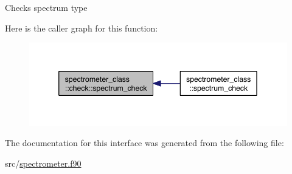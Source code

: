 Checks spectrum type 



Here is the caller graph for this function\-:
\nopagebreak
\begin{figure}[H]
\begin{center}
\leavevmode
\includegraphics[width=346pt]{interfacespectrometer__class_1_1check_a1d14d7c8751b28855644e3d7ab669260_icgraph}
\end{center}
\end{figure}




The documentation for this interface was generated from the following file\-:\begin{DoxyCompactItemize}
\item 
src/\hyperlink{spectrometer_8f90}{spectrometer.\-f90}\end{DoxyCompactItemize}
